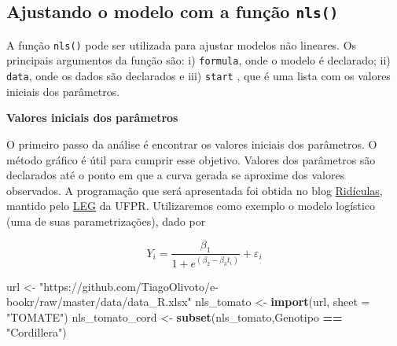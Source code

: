 \documentclass[
]{book}
\newenvironment{Shaded}{\begin{snugshade}}{\end{snugshade}}
\newcommand{\DataTypeTok}[1]{\textcolor[rgb]{0.13,0.29,0.53}{#1}}
\newcommand{\KeywordTok}[1]{\textcolor[rgb]{0.13,0.29,0.53}{\textbf{#1}}}
\newcommand{\NormalTok}[1]{#1}
\newcommand{\OperatorTok}[1]{\textcolor[rgb]{0.81,0.36,0.00}{\textbf{#1}}}
\newcommand{\StringTok}[1]{\textcolor[rgb]{0.31,0.60,0.02}{#1}}
\begin{document}
\hypertarget{ajustando-o-modelo-com-a-funuxe7uxe3o-nls}{%
\subsection{\texorpdfstring{Ajustando o modelo com a função \texttt{nls()}}{Ajustando o modelo com a função nls()}}\label{ajustando-o-modelo-com-a-funuxe7uxe3o-nls}}

A função \texttt{nls()}  pode ser utilizada para ajustar modelos não lineares. Os principais argumentos da função são: i) \texttt{formula}, onde o modelo é declarado; ii) \texttt{data}, onde os dados são declarados e iii) \texttt{start} , que é uma lista com os valores iniciais dos parâmetros.

\textbf{Valores iniciais dos parâmetros}

O primeiro passo da análise é encontrar os valores iniciais dos parâmetros. O método gráfico é útil para cumprir esse objetivo. Valores dos parâmetros são declarados até o ponto em que a curva gerada se aproxime dos valores observados. A programação que será apresentada foi obtida no blog \href{https://ridiculas.wordpress.com/tag/nao-linear/}{Ridículas}, mantido pelo \href{http://www.leg.ufpr.br/doku.php/start}{LEG} da UFPR. Utilizaremos como exemplo o modelo logístico (uma de suas parametrizações), dado por

\[
{Y_i} = \frac{{{\beta _1}}}{{1 + {e^{\left( {{\beta _2} - {\beta _3}{t_i}} \right)}}}} + {\varepsilon _i}
\]

\begin{Shaded}
\begin{Highlighting}[]
\NormalTok{url <-}\StringTok{ "https://github.com/TiagoOlivoto/e-bookr/raw/master/data/data_R.xlsx"}
\NormalTok{nls_tomato <-}\StringTok{ }\KeywordTok{import}\NormalTok{(url, }\DataTypeTok{sheet =} \StringTok{"TOMATE"}\NormalTok{)}
\NormalTok{nls_tomato_cord <-}\StringTok{ }\KeywordTok{subset}\NormalTok{(nls_tomato,Genotipo  }\OperatorTok{==}\StringTok{  "Cordillera"}\NormalTok{) }
\end{Highlighting}
\end{Shaded}
\end{document}
